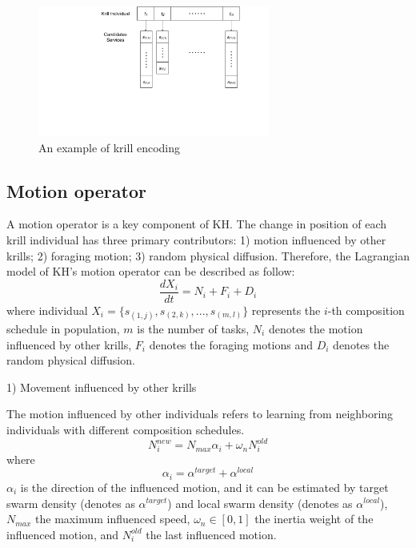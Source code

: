 \documentclass[journal]{IEEEtran}
\begin{document}
\begin{figure}[!t]
\centering
\includegraphics[width=3in]{./img/pic6.pdf}
\caption{An example of krill encoding}
\label{Krill encoding}
\end{figure}

\subsection{Motion operator}

A motion operator is a key component of KH. The change in position of each krill individual has three primary contributors: 1) motion influenced by other krills; 2) foraging motion; 3) random physical diffusion. Therefore, the Lagrangian model of KH's motion operator can be described as follow:
\begin{equation}
\frac{dX_i}{dt} =N_i+F_i+D_i
\end{equation}
where individual $X_i = \{s_{(1,j)}, s_{(2,k)}, . . . , s_{(m,l)}\}$ represents the $i$-th composition schedule in population, $m$ is the number of tasks, $N_i$ denotes the motion influenced by other krills, $F_i$ denotes the foraging motions and $D_i$ denotes the random physical diffusion.


1) Movement influenced by other krills

The motion influenced by other individuals refers to learning from neighboring individuals with different composition schedules.
\begin{equation}
N^{new}_i = N_{max}\alpha_i + \omega_n N^{old}_i
\end{equation}
where
\begin{equation}
\alpha_i = \alpha^{target} + \alpha^{local}
\end{equation}
$\alpha_i$ is the direction of the influenced motion, and it can be estimated by target swarm density (denotes as $\alpha^{target}$) and local swarm density (denotes as $\alpha^{local}$), $N_{max}$ the maximum influenced speed, $\omega_n \in [0, 1]$ the inertia weight of the influenced motion, and $N^{old}_{i}$ the last influenced motion.
\end{document}

